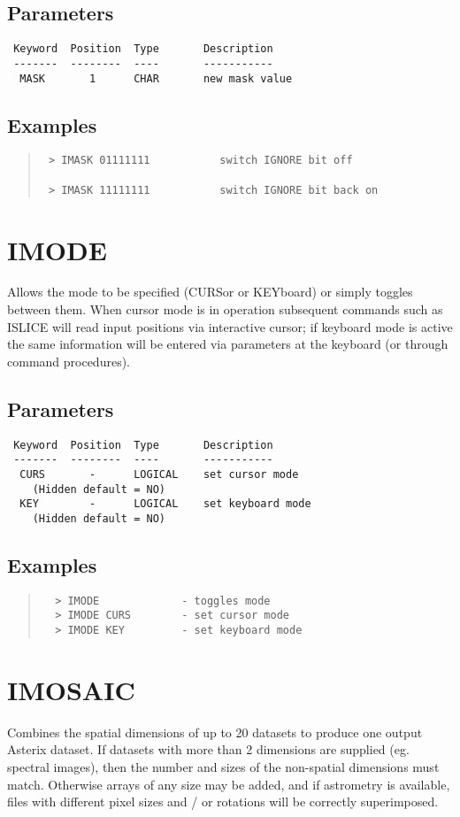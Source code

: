 \documentclass{book}
\renewcommand{\_}{{\tt\char'137}}     %
\begin{document}
\subsection{Parameters}
\begin{verbatim}
 Keyword  Position  Type       Description
 -------  --------  ----       -----------
  MASK       1      CHAR       new mask value

\end{verbatim}\subsection{Examples}
\begin{quote}\begin{verbatim}
 > IMASK 01111111           switch IGNORE bit off

 > IMASK 11111111           switch IGNORE bit back on
 \end{verbatim}\end{quote}
\section{IMODE}
Allows the mode to be specified (CURSor or KEYboard) or simply
toggles between them. When cursor mode is in operation subsequent
commands such as ISLICE will read input positions via interactive
cursor; if keyboard mode is active the same information will be
entered via parameters at the keyboard (or through command procedures).
\subsection{Parameters}
\begin{verbatim}
 Keyword  Position  Type       Description
 -------  --------  ----       -----------
  CURS       -      LOGICAL    set cursor mode
    (Hidden default = NO)
  KEY        -      LOGICAL    set keyboard mode
    (Hidden default = NO)
\end{verbatim}\subsection{Examples}
\begin{quote}\begin{verbatim}
  > IMODE             - toggles mode
  > IMODE CURS        - set cursor mode
  > IMODE KEY         - set keyboard mode
 \end{verbatim}\end{quote}
\section{IMOSAIC}
Combines the spatial dimensions of up to 20 datasets to produce one
output Asterix dataset. If datasets with more than 2 dimensions are
supplied (eg. spectral images), then the number and sizes of the
non-spatial dimensions must match. Otherwise arrays of any size may
be added, and if astrometry is available, files with different
pixel sizes and / or rotations will be correctly superimposed.
\end{document}
